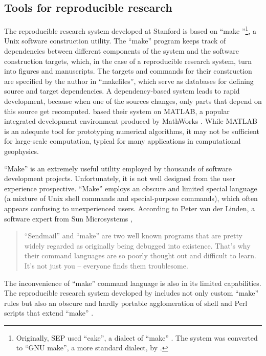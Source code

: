 \subsection{Tools for reproducible research}

The reproducible research system developed at Stanford is based on
``make \cite[]{make}''\footnote{Originally, SEP used ``cake'', a
dialect of ``make''
\cite[]{Nichols.sep.61.341,Claerbout.sep.67.145,Claerbout.sep.73.451,Claerbout.sep.77.427}.
The system was converted to ``GNU make'', a more standard dialect, by
\cite{Schwab.sep.89.217}.}, a Unix software construction utility.  The
``make'' program keeps track of dependencies between different
components of the system and the software construction targets, which,
in the case of a reproducible research system, turn into figures and
manuscripts. The targets and commands for their construction are
specified by the author in ``makefiles'', which serve as databases for
defining source and target dependencies. A dependency-based system
leads to rapid development, because when one of the sources changes,
only parts that depend on this source get recomputed.  \cite{donoho}
based their system on MATLAB, a popular integrated development
environment produced by MathWorks \cite[]{matlab}.  While MATLAB is an
adequate tool for prototyping numerical algorithms, it may not be
sufficient for large-scale computation, typical for many applications
in computational geophysics.

``Make'' is an extremely useful utility employed by thousands of
software development projects. Unfortunately, it is not
well designed from the user experience prospective. ``Make'' employs
an obscure and limited special language (a mixture of Unix shell
commands and special-purpose commands), which often appears confusing
to unexperienced users. According to Peter van der Linden, a software
expert from Sun Microsystems \cite[]{linden},
\begin{quote}
  ``Sendmail'' and ``make'' are two well known programs that are
  pretty widely regarded as originally being debugged into existence.
  That's why their command languages are so poorly thought out and
  difficult to learn. It's not just you -- everyone finds them
  troublesome.
\end{quote}
The inconvenience of ``make'' command language is also in its limited
capabilities.  The reproducible research system developed by
\cite[]{matt} includes not only custom ``make'' rules but also an
obscure and hardly portable agglomeration of shell and Perl scripts
that extend ``make'' \cite[]{Fomel.sep.94.matt3}.


